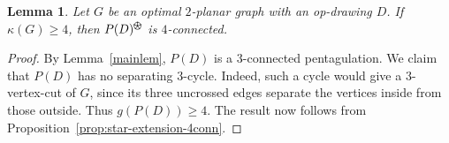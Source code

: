 \documentclass[10pt,a4paper]{amsart}
\newtheorem{lem}{Lemma}
\newcommand{\vertexFiveStar}{%
  \begin{tikzpicture}[baseline=-0.5ex, scale=0.1]
    \draw (0,0) circle (1);
    \filldraw (0,0) circle (0.12);
    \foreach \angle in {90,162,234,306,378} {
      \draw (0,0) -- ({cos(\angle)}, {sin(\angle)});
      \filldraw ({cos(\angle)}, {sin(\angle)}) circle (0.08);
    }
  \end{tikzpicture}%
}
\begin{document}
\begin{lem}\label{lem:vertexFiveStar4-connected}
Let \(G\) be an optimal \(2\)-planar graph with an op-drawing \(D\). 
If \(\kappa(G)\ge 4\), then \(P(D)^{\vertexFiveStar}\) is \(4\)-connected.
\end{lem}

\begin{proof}
By Lemma~\ref{mainlem}, \(P(D)\) is a \(3\)-connected pentagulation. 
We claim that \(P(D)\) has no separating \(3\)-cycle. 
Indeed, such a cycle would give a \(3\)-vertex-cut of \(G\), since its three uncrossed edges separate the vertices inside from those outside. 
Thus \(g(P(D))\ge 4\). 
The result now follows from Proposition~\ref{prop:star-extension-4conn}.
\end{proof}
\end{document}
